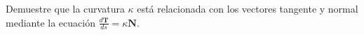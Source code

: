 \item Demuestre que la curvatura $\kappa$ está relacionada con los vectores tangente y normal mediante la ecuación $\frac{d\mathbf{T}}{ds} = \kappa \mathbf{N}$.
